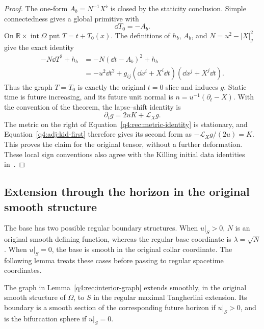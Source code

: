 \begin{proof}
The one-form $A_b=N^{-1}X^\flat$ is closed by the staticity conclusion.  Simple
connectedness gives a global primitive with
\begin{equation}
 \dd T_0=-A_b.
 \label{q4:rec:primitive}
\end{equation}
On $\mathbb R\times\operatorname{int}\Omega$ put $T=t+T_0(x)$.  The definitions
of $h_b$, $A_b$, and $N=u^2-|X|_g^2$ give the exact identity
\begin{equation}
 \begin{split}
 -N\dd T^2+h_b
 &=-N(\dd t-A_b)^2+h_b\\
 &=-u^2\dd t^2+
   g_{ij}(\dd x^i+X^i\dd t)(\dd x^j+X^j\dd t).
 \end{split}
 \label{q4:rec:metric-identity}
\end{equation}
Thus the graph $T=T_0$ is exactly the original $t=0$ slice and induces $g$.
Static time is future increasing, and its future unit normal is
$n=u^{-1}(\partial_t-X)$.  With the convention of the theorem, the
lapse--shift identity is
\[
 \partial_tg=2uK+\mathcal L_Xg.
\]
The metric on the right of Equation~\eqref{q4:rec:metric-identity} is stationary,
and Equation~\eqref{q4:adj:kid-first} therefore gives its second form as
$-\mathcal L_Xg/(2u)=K$.  This proves the claim for the original tensor,
without a further deformation.  These local sign conventions also agree
with the Killing initial data identities
in~\cite[Equations~(2.6) and~(2.14)]{BeigChrusciel1997KID}.
\end{proof}

\subsection{Extension through the horizon in the original smooth structure}

The base has two possible regular boundary structures.  When $u|_S>0$,
$N$ is an original smooth defining function, whereas the regular base
coordinate is $\lambda=\sqrt N$.  When $u|_S=0$, the base is smooth in the
original collar coordinate.  The following lemma treats these cases before
passing to regular spacetime coordinates.

\begin{lemma}
\label{q4:rec:horizon-extension}
The graph in Lemma~\ref{q4:rec:interior-graph} extends smoothly, in the original
smooth structure of $\Omega$, to $S$ in the regular maximal Tangherlini
extension.  Its boundary is a smooth section of the corresponding future
horizon if $u|_S>0$, and is the bifurcation sphere if $u|_S=0$.
\end{lemma}

